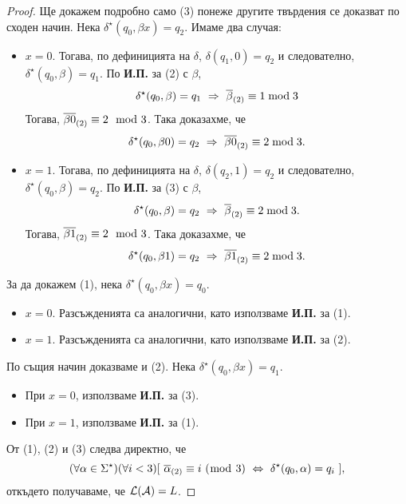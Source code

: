 \begin{proof}
  Ще докажем подробно само (3) понеже другите твърдения се доказват по сходен начин.
  Нека $\delta^\star(q_0,\beta x) = q_2$. 
  Имаме два случая:
  \begin{itemize}
  \item 
    $x = 0$. 
    Тогава, по дефиницията на $\delta$, 
    $\delta(q_1,0) = q_2$ и следователно, $\delta^\star(q_0,\beta) = q_1$.
    По {\bf И.П.} за (2) с $\beta$,
    \[\delta^\star(q_0,\beta) = q_1\ \Rightarrow\ \ov{\beta}_{(2)} \equiv 1 \bmod 3\]
    Тогава, $\overline{\beta0}_{(2)} \equiv 2 \mod 3$. Така доказахме, че
    \[\delta^\star(q_0,\beta 0) = q_2\ \Rightarrow\ \overline{\beta 0}_{(2)} \equiv 2 \bmod 3.\]
  \item
    $x = 1$.
    Тогава, по дефиницията на $\delta$, $\delta(q_2,1) = q_2$ и следователно,
    $\delta^\star(q_0,\beta) = q_2$.
    По {\bf И.П.} за (3) с $\beta$,
    \[\delta^\star(q_0,\beta) = q_2\ \Rightarrow\ \ov{\beta}_{(2)} \equiv 2 \bmod 3.\]
    Тогава, $\overline{\beta1}_{(2)} \equiv 2 \mod 3$. Така доказахме, че
    \[\delta^\star(q_0,\beta 1) = q_2\ \Rightarrow\ \overline{\beta 1}_{(2)} \equiv 2 \bmod 3.\]
  \end{itemize}
  За да докажем (1), нека $\delta^\star(q_0,\beta x) = q_0$. 
  \begin{itemize}
  \item 
    $x = 0$. Разсъжденията са аналогични, като използваме {\bf И.П.} за (1).
  \item
    $x = 1$. Разсъжденията са аналогични, като използваме {\bf И.П.} за (2).
  \end{itemize}
  
  По същия начин доказваме и (2). Нека $\delta^\star(q_0,\beta x) = q_1$. 
  \begin{itemize}
  \item 
    При $x = 0$, използваме {\bf И.П.} за (3).
  \item
    При $x = 1$, използваме {\bf И.П.} за (1).
  \end{itemize}
  От (1), (2) и (3) следва директно, че
  \[(\forall\alpha\in\Sigma^\star)(\forall i < 3)[\ \ov{\alpha}_{(2)} \equiv i\ (\bmod\ 3)\ \Leftrightarrow\ \delta^\star(q_0,\alpha) = q_i\ ],\]
  откъдето получаваме, че $\mathcal{L}(\mathcal{A}) = L$.
\end{proof}



